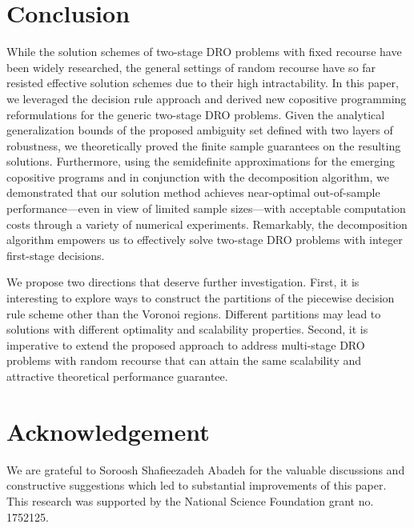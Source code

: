 \documentclass{article}
\begin{document}
\section{Conclusion}
\label{conclusion}
While the solution schemes of two-stage DRO problems with fixed recourse have been widely researched, the general settings of random recourse have so far resisted effective solution schemes due to their high intractability. %
In this paper, we leveraged the decision rule approach and derived new copositive programming reformulations for the generic two-stage DRO problems. Given the analytical generalization bounds of the proposed ambiguity set defined with two layers of robustness, we theoretically proved the finite sample guarantees on the resulting solutions. %
Furthermore, using the semidefinite approximations for the emerging copositive programs and in conjunction with the decomposition algorithm, we demonstrated that our solution method achieves near-optimal out-of-sample performance---even in view of limited sample sizes---with acceptable computation costs through a variety of numerical experiments. 
Remarkably, the decomposition algorithm empowers us to effectively solve  two-stage DRO problems with integer first-stage decisions. 

We propose two directions that deserve further investigation. First, it is interesting to explore ways to construct the partitions of the piecewise decision rule scheme other than the Voronoi regions. Different partitions may lead to  solutions with different optimality and scalability properties. Second, it is imperative to extend the proposed approach to  address multi-stage DRO problems with random recourse %
that can attain the
same scalability and attractive theoretical performance guarantee.


\section*{Acknowledgement}
We are grateful to Soroosh Shafieezadeh Abadeh for the valuable discussions and constructive suggestions which led to substantial improvements of this paper. This research was supported by the National Science Foundation grant no. 1752125.
\end{document}
